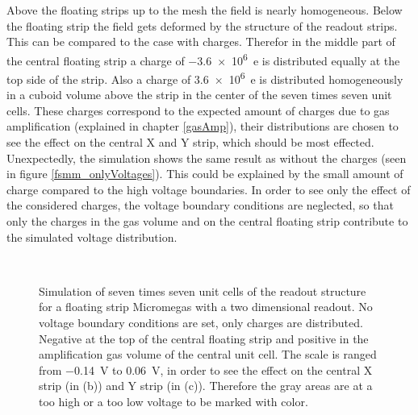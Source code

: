 \documentclass[
a4paper,                                %
twoside,                                %
BCOR1.4cm,                      %
10pt,                           %
headings=normal,                %
headsepline,                    %
clearplainpage, %
final,                                  %
div=14,
parskip=full,
openright,
bibliography=toc
]{scrreprt}
\begin{document}
Above the floating strips up to the mesh the field is nearly homogeneous. Below the floating strip the field gets deformed by the structure of the readout strips. This can be compared to the case with charges. Therefor in the middle part of the central floating strip a charge of \SI{-3.6e6}{e} is distributed equally at the top side of the strip. Also a charge of \SI{+3.6e6}{e} is distributed homogeneously in a cuboid volume above the strip in the center of the seven times seven unit cells. These charges correspond to the expected amount of charges due to gas amplification (explained in chapter \ref{gasAmp}), their distributions are chosen to see the effect on the central X and Y strip, which should be most effected. Unexpectedly, the simulation shows the same result as without the charges (seen in figure \ref{fsmm_onlyVoltages}). This could be explained by the small amount of charge compared to the high voltage boundaries. In order to see only the effect of the considered charges, the voltage boundary conditions are neglected, so that only the charges in the gas volume and on the central floating strip contribute to the simulated voltage distribution. 

\begin{figure}[H]
	\centering
	\\
	\qquad
	\caption{Simulation of seven times seven unit cells of the readout structure for a floating strip Micromegas with a two dimensional readout. No voltage boundary conditions are set, only charges are distributed. Negative at the top of the central floating strip and positive in the amplification gas volume of the central unit cell. The scale is ranged from \SI{-0.14}{V} to \SI{0.06}{V}, in order to see the effect on the central X strip (in (b)) and Y strip (in (c)). Therefore the gray areas are at a too high or a too low voltage to be marked with color.}
	\label{signalfsmmSim}
\end{figure}
\end{document}
